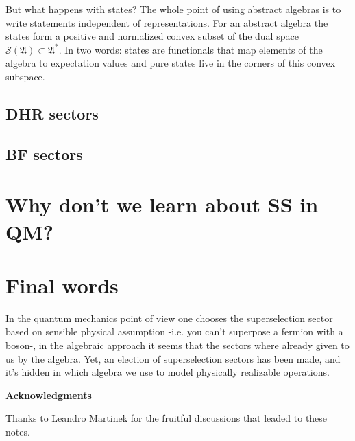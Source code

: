 But what happens with states? The whole point of using abstract algebras
is to write statements independent of representations. For an abstract
algebra the states form a positive and normalized convex subset of the dual
space $\mathcal{S}(\mathfrak{A}) \subset \mathfrak{A}^*$. In two words: states
are functionals that map elements of the algebra to expectation values
and pure states live in the corners of this convex subspace.  


\subsection{DHR sectors}

\subsection{BF sectors}


\section{Why don't we learn about SS in QM?}

\section{Final words}

In the quantum mechanics point of view one chooses the superselection
sector based on sensible physical assumption -i.e. you can't superpose a 
fermion with a boson-, in the algebraic approach it seems that the sectors
where already given to us by the algebra. Yet, an election of superselection
sectors has been made, and it's hidden in which algebra we use to model
physically realizable operations.   


\begin{center}
\textbf{Acknowledgments}

Thanks to Leandro Martinek for the fruitful discussions that leaded
to these notes. 
\end{center}

